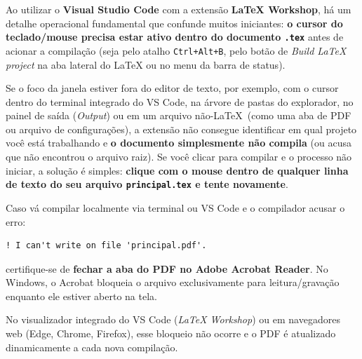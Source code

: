 \documentclass[12pt, a4paper]{article}
\begin{document}
\begin{atencao}
Ao utilizar o \textbf{Visual Studio Code} com a extensão \textbf{LaTeX Workshop}, há um detalhe operacional fundamental que confunde muitos iniciantes: \textbf{o cursor do teclado/mouse precisa estar ativo dentro do documento \texttt{.tex}} antes de acionar a compilação (seja pelo atalho \texttt{Ctrl+Alt+B}, pelo botão de \textit{Build LaTeX project} na aba lateral do LaTeX ou no menu da barra de status).

Se o foco da janela estiver fora do editor de texto, por exemplo, com o cursor dentro do terminal integrado do VS Code, na árvore de pastas do explorador, no painel de saída (\textit{Output}) ou em um arquivo não-\LaTeX \ (como uma aba de PDF ou arquivo de configurações), a extensão não consegue identificar em qual projeto você está trabalhando e \textbf{o documento simplesmente não compila} (ou acusa que não encontrou o arquivo raiz). Se você clicar para compilar e o processo não iniciar, a solução é simples: \textbf{clique com o mouse dentro de qualquer linha de texto do seu arquivo \texttt{principal.tex} e tente novamente}.
\end{atencao}

\begin{atencao}
Caso vá compilar localmente via terminal ou VS Code e o compilador acusar o erro:
\begin{verbatim}
! I can't write on file 'principal.pdf'.
\end{verbatim}
certifique-se de \textbf{fechar a aba do PDF no Adobe Acrobat Reader}. No Windows, o Acrobat bloqueia o arquivo exclusivamente para leitura/gravação enquanto ele estiver aberto na tela.

No visualizador integrado do VS Code (\textit{LaTeX Workshop}) ou em navegadores web (Edge, Chrome, Firefox), esse bloqueio não ocorre e o PDF é atualizado dinamicamente a cada nova compilação.
\end{atencao}
\end{document}
